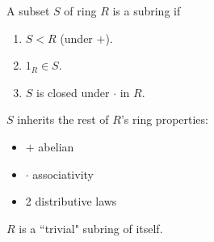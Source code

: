\begin{definition}[Subring]
A subset $S$ of ring $R$ is a subring if
\begin{enumerate}[label=\roman*)]
    \item $S<R$ (under $+$).
    \item $1_R\in S$.
    \item $S$ is closed under $\cdot$ in $R$.
\end{enumerate}
$S$ inherits the rest of $R$'s ring properties:
\begin{itemize}
    \item $+$ abelian
    \item $\cdot$ associativity
    \item 2 distributive laws
\end{itemize}
$R$ is a ``trivial" subring of itself.
\end{definition}
\newpage
